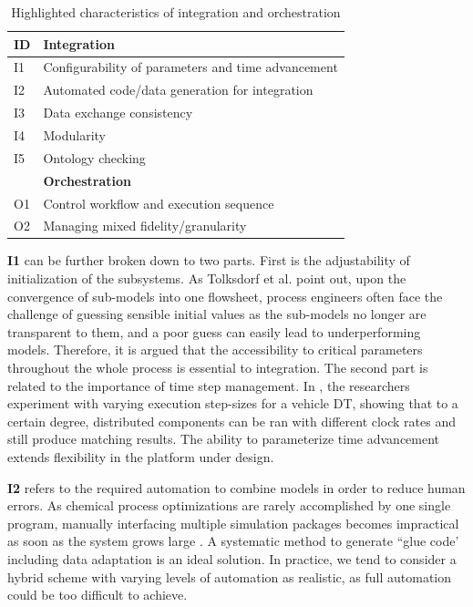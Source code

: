 \begin{table}[hbt!]
\centering
\begin{tabular}{|l|l|}
\hline
\textbf{ID} & \textbf{Integration} \\ \hline           
I1 & Configurability of parameters and time advancement \\ \hline
I2 & Automated code/data generation for integration \\ \hline
I3 & Data exchange consistency \\ \hline
I4 & Modularity \\ \hline    
I5 & Ontology checking \\ \hline
\hline                     
   & \textbf{Orchestration} \\ \hline
O1 & Control workflow and execution sequence \\ \hline
O2 & Managing mixed fidelity/granularity \\ \hline
\end{tabular}
\caption{Highlighted characteristics of integration and orchestration}
\label{tab:iotopics}
\end{table}

\textbf{I1} can be further broken down to two parts. First is the adjustability of initialization of the subsystems. As Tolksdorf et al. \cite{Tolksdorf2016} point out, upon the convergence of sub-models into one flowsheet, process engineers often face the challenge of guessing sensible initial values as the sub-models no longer are transparent to them, and a poor guess can easily lead to underperforming models. Therefore, it is argued that the accessibility to critical parameters throughout the whole process is essential to integration. The second part is related to the importance of time step management. In \cite{Neema2014}, the researchers experiment with varying execution step-sizes for a vehicle DT, showing that to a certain degree, distributed components can be ran with different clock rates and still produce matching results. The ability to parameterize time advancement extends flexibility in the platform under design.

\textbf{I2} refers to the required automation to combine models in order to reduce human errors. As chemical process optimizations are rarely accomplished by one single program, manually interfacing multiple simulation packages becomes impractical as soon as the system grows large \cite{Krone2020}. A systematic method to generate ``glue code' including data adaptation is an ideal solution. In practice, we tend to consider a hybrid scheme with varying levels of automation as realistic, as full automation could be too difficult to achieve.

